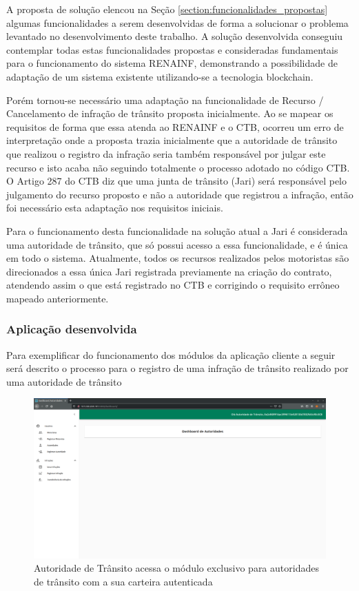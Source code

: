 A proposta de solução elencou na Seção \ref{section:funcionalidades_propostas} algumas funcionalidades a serem desenvolvidas de forma a solucionar o problema levantado no desenvolvimento deste trabalho. A solução desenvolvida conseguiu contemplar todas estas funcionalidades propostas e consideradas fundamentais para o funcionamento do sistema RENAINF, demonstrando a possibilidade de adaptação de um sistema existente utilizando-se a tecnologia blockchain.

Porém tornou-se necessário uma adaptação na funcionalidade de Recurso / Cancelamento de infração de trânsito proposta inicialmente. Ao se mapear os requisitos de forma que essa atenda ao RENAINF e o CTB, ocorreu um erro de interpretação onde a proposta trazia inicialmente que a autoridade de trânsito que realizou o registro da infração seria também responsável por julgar este recurso e isto acaba não seguindo totalmente o processo adotado no código CTB. O Artigo 287 do CTB diz que uma junta de trânsito (Jari) será responsável pelo julgamento do recurso proposto e não a autoridade que registrou a infração, então foi necessário esta adaptação nos requisitos iniciais.

Para o funcionamento desta funcionalidade na solução atual a Jari é considerada uma autoridade de trânsito, que só possui acesso a essa funcionalidade, e é única em todo o sistema. Atualmente, todos os recursos realizados pelos motoristas são direcionados a essa única Jari registrada previamente na criação do contrato, atendendo assim o que está registrado no CTB e corrigindo o requisito errôneo mapeado anteriormente.

\subsubsection{Aplicação desenvolvida}

Para exemplificar do funcionamento dos módulos da aplicação cliente a seguir será descrito o processo para o registro de uma infração de trânsito realizado por uma autoridade de trânsito

    \begin{figure}[H]
         \centering
         \includegraphics[scale=0.2]{figuras/capitulo_5/registro/print_1.png}
         \caption{Autoridade de Trânsito acessa o módulo exclusivo para autoridades de trânsito com a sua carteira autenticada}
         \label{fig:dapp_rede_ethereum}
    \end{figure}
 
